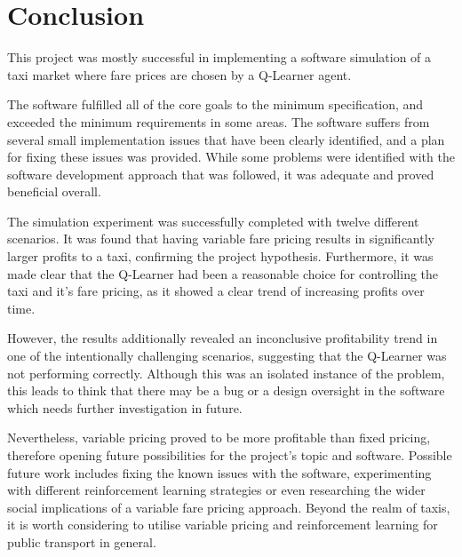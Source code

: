 \newpage
\section{Conclusion}
\label{sec:conclusion}

This project was mostly successful in implementing a software simulation of a
taxi market where fare prices are chosen by a Q-Learner agent. 

The software fulfilled all of the core goals to the minimum specification, and
exceeded the minimum requirements in some areas. The software suffers from
several small implementation issues that have been clearly identified, and a
plan for fixing these issues was provided. While some problems were identified
with the software development approach that was followed, it was adequate and
proved beneficial overall.

The simulation experiment was successfully completed with twelve different
scenarios. It was found that having variable fare pricing results in
significantly larger profits to a taxi, confirming the project hypothesis.
Furthermore, it was made clear that the Q-Learner had been a reasonable choice
for controlling the taxi and it's fare pricing, as it showed a clear trend of
increasing profits over time.

However, the results additionally revealed an inconclusive profitability trend
in one of the intentionally challenging scenarios, suggesting that the
Q-Learner was not performing correctly. Although this was an isolated instance
of the problem, this leads to think that there may be a bug or a design
oversight in the software which needs further investigation in future.

Nevertheless, variable pricing proved to be more profitable than fixed pricing,
therefore opening future possibilities for the project's topic and software.
Possible future work includes fixing the known issues with the software,
experimenting with different reinforcement learning strategies or even
researching the wider social implications of a variable fare pricing approach.
Beyond the realm of taxis, it is worth considering to utilise variable pricing
and reinforcement learning for public transport in general.
